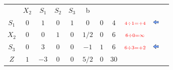 \begin{frame}
{\begin{table}
\begin{tabular}{c c c c c c c c c c c}
				&\cellcolor{blue!100} \color{red} $\scriptstyle X_2$ 
				&\cellcolor{blue!100} \color{red} $\scriptstyle S_1$ 
				&\cellcolor{blue!100} \color{white} $\scriptstyle S_2$ 
				&\cellcolor{blue!100} \color{red} $\scriptstyle S_3$ 
				&\cellcolor{blue!100} \color{white} \scriptsize b
				&
				&
				& \\
				\cline{1-8}
				\cellcolor{blue!100} \color{red} $\scriptstyle S_1$
				& \cellcolor{yellow!50} $\scriptstyle 0$
				& \cellcolor{gray!50} $\scriptstyle 1$
				& \cellcolor{yellow!50} $\scriptstyle 0$
				& \cellcolor{yellow!50} $\scriptstyle 1$
				& \cellcolor{yellow!50} $\scriptstyle 0$
				& \cellcolor{yellow!50} $\scriptstyle 0$
				& \cellcolor{gray!50} $\scriptstyle 4$
				& $\scriptstyle  \color{red} 4 \div 1 = +4$
				& \includegraphics[width=0.3cm,height=0.3cm]{setaesquerda.jpg}
				& \\
				\cline{1-8} 
			    \cellcolor{blue!100} \color{red} $\scriptstyle X_2$
				& \cellcolor{yellow!50} $\scriptstyle 0$
				& \cellcolor{gray!50} $\scriptstyle 0$
				& \cellcolor{yellow!50} $\scriptstyle 1$
				& \cellcolor{yellow!50} $\scriptstyle 0$			
				& \cellcolor{yellow!50} $\scriptstyle 1/2$
				& \cellcolor{yellow!50} $\scriptstyle 0$
				& \cellcolor{gray!50} $\scriptstyle 6$
				& $\scriptstyle  \color{red} 6 \div 0 = \infty$
				&
				& \\
				\cline{1-8} 
				\cellcolor{blue!100} \color{red} $\scriptstyle S_3$
				& \cellcolor{yellow!50} $\scriptstyle 0$
				& \cellcolor{gray!50} $\scriptstyle 3$
				& \cellcolor{yellow!50} $\scriptstyle 0$
				& \cellcolor{yellow!50} $\scriptstyle 0$
				& \cellcolor{yellow!50} $\scriptstyle -1$
				& \cellcolor{yellow!50} $\scriptstyle 1$
				& \cellcolor{gray!50} $\scriptstyle 6$
				& $\scriptstyle  \color{red} 6 \div 3 = +2$
				& \includegraphics[width=0.3cm,height=0.3cm]{setaesquerda.jpg}
				& \\
				\cline{1-8}
				\cellcolor{blue!100} \color{white} $\scriptstyle Z$
				& \cellcolor{yellow!50} $\scriptstyle 1$
				& \cellcolor{gray!50} $\scriptstyle -3$
				& \cellcolor{yellow!50} $\scriptstyle 0$
				& \cellcolor{yellow!50} $\scriptstyle 0$
				& \cellcolor{yellow!50} $\scriptstyle 5/2$
				& \cellcolor{yellow!50} $\scriptstyle 0$
				& \cellcolor{gray!50} $\scriptstyle 30$ 
				&
				&
				& \\

\end{tabular}
\end{table}}
\end{frame}
